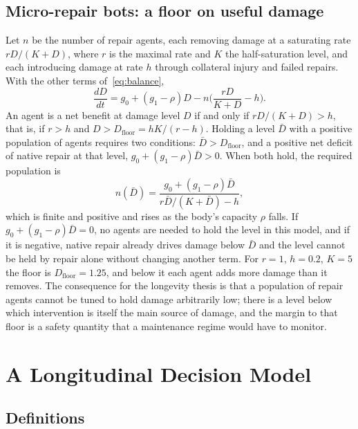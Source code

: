 \documentclass[11pt]{article}
\theoremstyle{plain}
\theoremstyle{definition}
\theoremstyle{remark}
\begin{document}
\subsection{Micro-repair bots: a floor on useful damage}

Let $n$ be the number of repair agents, each removing damage at a saturating rate $rD/(K+D)$, where $r$ is the maximal rate and $K$ the half-saturation level, and each introducing damage at rate $h$ through collateral injury and failed repairs. With the other terms of~\eqref{eq:balance},
\begin{equation}\label{eq:bots}
\frac{dD}{dt}=g_0+(g_1-\rho)D-n\Big(\frac{rD}{K+D}-h\Big).
\end{equation}
An agent is a net benefit at damage level $D$ if and only if $rD/(K+D)>h$, that is, if $r>h$ and $D>D_{\mathrm{floor}}=hK/(r-h)$. Holding a level $\bar D$ with a positive population of agents requires two conditions: $\bar D>D_{\mathrm{floor}}$, and a positive net deficit of native repair at that level, $g_0+(g_1-\rho)\bar D>0$. When both hold, the required population is
\begin{equation}
n(\bar D)=\frac{g_0+(g_1-\rho)\bar D}{r\bar D/(K+\bar D)-h},
\end{equation}
which is finite and positive and rises as the body's capacity $\rho$ falls. If $g_0+(g_1-\rho)\bar D=0$, no agents are needed to hold the level in this model, and if it is negative, native repair already drives damage below $\bar D$ and the level cannot be held by repair alone without changing another term. For $r=1$, $h=0.2$, $K=5$ the floor is $D_{\mathrm{floor}}=1.25$, and below it each agent adds more damage than it removes. The consequence for the longevity thesis is that a population of repair agents cannot be tuned to hold damage arbitrarily low; there is a level below which intervention is itself the main source of damage, and the margin to that floor is a safety quantity that a maintenance regime would have to monitor.

\section{A Longitudinal Decision Model}\label{sec:model}

\subsection{Definitions}
\end{document}

